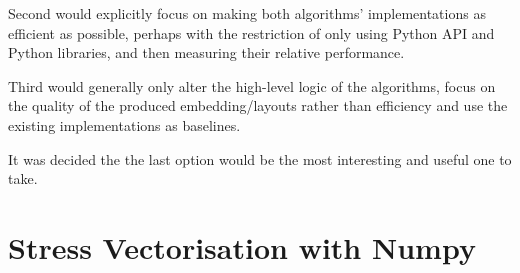 \documentclass{l4proj}
\begin{document}
Second would explicitly focus on making both algorithms' implementations as efficient as possible, perhaps with the restriction of only using Python API and Python libraries, and then measuring their relative performance.

Third would generally only alter the high-level logic of the algorithms, focus on the quality of the produced embedding/layouts rather than efficiency and use the existing implementations as baselines.

It was decided the the last option would be the most interesting and useful one to take.

\section{Stress Vectorisation with Numpy}
\end{document}
